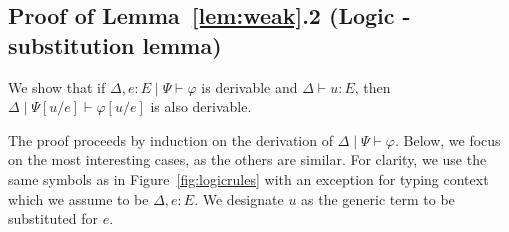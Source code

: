 \documentclass[a4paper,UKenglish,cleveref, autoref, thm-restate]{lipics-v2021}
\newcommand{\ts}{\vdash}
\newcommand{\hastype}[3]{#1\ts #2 : #3}
\newcommand{\logicJ}[3][\Delta]{#1 \mid #2 \vdash #3}
\begin{document}
\subsection*{Proof of Lemma~\ref{lem:weak}.2 (Logic - substitution lemma)}
We show that if $\logicJ[\Delta, e:E]{\Psi}{\varphi}$ is derivable 
and $\hastype{\Delta}uE$, then $\logicJ[\Delta]{\Psi[u/e]}{\varphi[u/e]}$
is also derivable.

The proof proceeds by induction on the derivation of $\logicJ[\Delta]{\Psi}{\varphi}$. Below, we focus on the most interesting cases, as the others are similar. For clarity, we use the same symbols as in Figure~\ref{fig:logicrules} with an exception for typing context which we
assume to be $\Delta,e:E$. We designate $u$ as the generic term to
be substituted for $e$.
\end{document}
